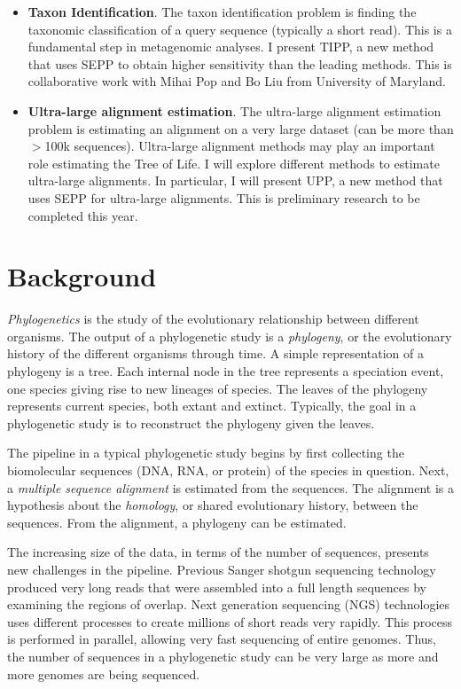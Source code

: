 \documentclass[times, 10pt]{article}
\begin{document}
\begin{itemize}
\item \textbf{Taxon Identification}. The taxon identification problem is finding the taxonomic classification of a query sequence (typically a short read).  This is a fundamental step in metagenomic analyses.  I present TIPP, a new method that uses SEPP to obtain higher sensitivity than the leading methods.  This is collaborative work with Mihai Pop and Bo Liu from University of Maryland.
\item \textbf{Ultra-large alignment estimation}. The ultra-large alignment estimation problem is estimating an alignment on a very large dataset (can be more than $>$100k sequences).  Ultra-large alignment methods may play an important role estimating the Tree of Life.  I will explore different methods to estimate ultra-large alignments.  In particular, I will present UPP, a new method that uses SEPP for ultra-large alignments.  This is preliminary research to be completed this year.
\end{itemize}

\section{Background}
\emph{Phylogenetics} is the study of the evolutionary relationship between different organisms.  The output of a phylogenetic study is a \emph{phylogeny}, or the evolutionary history of the different organisms through time.  A simple representation of a phylogeny is a tree.  Each internal node in the tree represents a speciation event, one species giving rise to new lineages of species.  The leaves of the phylogeny represents current species, both extant and extinct.  Typically, the goal in a phylogenetic study is to reconstruct the phylogeny given the leaves.

The pipeline in a typical phylogenetic study begins by first collecting the biomolecular sequences (DNA, RNA, or protein) of the species in question.  Next, a \emph{multiple sequence alignment} is estimated from the sequences.  The alignment is a hypothesis about the \emph{homology}, or shared evolutionary history, between the sequences.  From the alignment, a phylogeny can be estimated.  

The increasing size of the data, in terms of the number of sequences, presents new challenges in the pipeline.  Previous Sanger shotgun sequencing technology produced very long reads that were assembled into a full length sequences by examining the regions of overlap.  Next generation sequencing (NGS) technologies uses different processes to create millions of short reads very rapidly.  This process is performed in parallel, allowing very fast sequencing of entire genomes.  Thus, the number of sequences in a phylogenetic study can be very large as more and more genomes are being sequenced.
\end{document}

